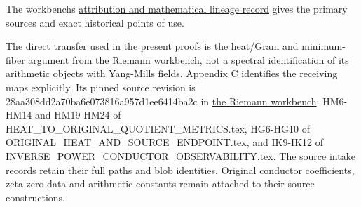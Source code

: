 \documentclass[11pt,a4paper]{article}
\renewcommand{\[}{\begingroup\small\originaldisplaystart}
\renewcommand{\]}{\originaldisplayend\endgroup}
\begin{document}
The workbench\textquotesingle s
\href{https://github.com/KokunoYumeto/yang-mills-interacting-workbench/blob/main/ATTRIBUTION.md}{attribution
and mathematical lineage record} gives the primary sources and exact
historical points of use.

The direct transfer used in the present proofs is the heat/Gram and
minimum-fiber argument from the Riemann workbench, not a spectral
identification of its arithmetic objects with Yang-Mills fields.
Appendix C identifies the receiving maps explicitly. Its pinned source
revision is
{\allowbreak{}2\allowbreak{}8\allowbreak{}a\allowbreak{}a\allowbreak{}3\allowbreak{}0\allowbreak{}8\allowbreak{}d\allowbreak{}d\allowbreak{}2\allowbreak{}a\allowbreak{}7\allowbreak{}0\allowbreak{}b\allowbreak{}a\allowbreak{}6\allowbreak{}e\allowbreak{}0\allowbreak{}7\allowbreak{}3\allowbreak{}8\allowbreak{}1\allowbreak{}6\allowbreak{}a\allowbreak{}9\allowbreak{}5\allowbreak{}7\allowbreak{}d\allowbreak{}1\allowbreak{}e\allowbreak{}e\allowbreak{}6\allowbreak{}4\allowbreak{}1\allowbreak{}4\allowbreak{}b\allowbreak{}a\allowbreak{}2\allowbreak{}c\allowbreak{}}
in
\href{https://github.com/KokunoYumeto/zeta-function-research-reader/tree/128aa308dd2a70ba6e073816a957d1ee6414ba2c}{the
Riemann workbench}: HM6-HM14 and HM19-HM24 of
{\ttfamily H\allowbreak{}E\allowbreak{}A\allowbreak{}T\allowbreak{}\_\allowbreak{}T\allowbreak{}O\allowbreak{}\_\allowbreak{}O\allowbreak{}R\allowbreak{}I\allowbreak{}G\allowbreak{}I\allowbreak{}N\allowbreak{}A\allowbreak{}L\allowbreak{}\_\allowbreak{}Q\allowbreak{}U\allowbreak{}O\allowbreak{}T\allowbreak{}I\allowbreak{}E\allowbreak{}N\allowbreak{}T\allowbreak{}\_\allowbreak{}M\allowbreak{}E\allowbreak{}T\allowbreak{}R\allowbreak{}I\allowbreak{}C\allowbreak{}S\allowbreak{}.\allowbreak{}t\allowbreak{}e\allowbreak{}x\allowbreak{}},
HG6-HG10 of
{\ttfamily O\allowbreak{}R\allowbreak{}I\allowbreak{}G\allowbreak{}I\allowbreak{}N\allowbreak{}A\allowbreak{}L\allowbreak{}\_\allowbreak{}H\allowbreak{}E\allowbreak{}A\allowbreak{}T\allowbreak{}\_\allowbreak{}A\allowbreak{}N\allowbreak{}D\allowbreak{}\_\allowbreak{}S\allowbreak{}O\allowbreak{}U\allowbreak{}R\allowbreak{}C\allowbreak{}E\allowbreak{}\_\allowbreak{}E\allowbreak{}N\allowbreak{}D\allowbreak{}P\allowbreak{}O\allowbreak{}I\allowbreak{}N\allowbreak{}T\allowbreak{}.\allowbreak{}t\allowbreak{}e\allowbreak{}x\allowbreak{}},
and IK9-IK12 of
{\ttfamily I\allowbreak{}N\allowbreak{}V\allowbreak{}E\allowbreak{}R\allowbreak{}S\allowbreak{}E\allowbreak{}\_\allowbreak{}P\allowbreak{}O\allowbreak{}W\allowbreak{}E\allowbreak{}R\allowbreak{}\_\allowbreak{}C\allowbreak{}O\allowbreak{}N\allowbreak{}D\allowbreak{}U\allowbreak{}C\allowbreak{}T\allowbreak{}O\allowbreak{}R\allowbreak{}\_\allowbreak{}O\allowbreak{}B\allowbreak{}S\allowbreak{}E\allowbreak{}R\allowbreak{}V\allowbreak{}A\allowbreak{}B\allowbreak{}I\allowbreak{}L\allowbreak{}I\allowbreak{}T\allowbreak{}Y\allowbreak{}.\allowbreak{}t\allowbreak{}e\allowbreak{}x\allowbreak{}}.
The source intake records retain their full paths and blob identities.
Original conductor coefficients, zeta-zero data and arithmetic constants
remain attached to their source constructions.
\end{document}
